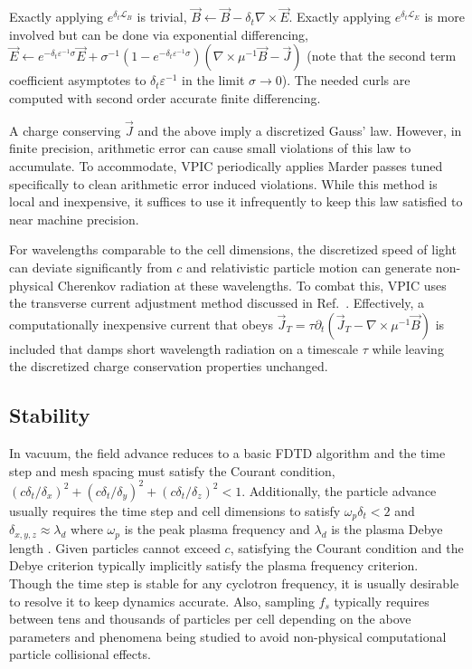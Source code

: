 \documentclass[letter,10pt]{article}
\newcommand{\eps}{\varepsilon}
\newcommand{\vecJ}{\vec{J}}
\newcommand{\vecE}{\vec{E}}
\newcommand{\vecB}{\vec{B}}
\newcommand{\op}{\mathcal{L}}
\newcommand{\PDeriv}[2]{\partial_{#2}#1}
\newcommand{\Curl}[1]{\nabla \times #1}
\begin{document}
Exactly applying $e^{\delta_t \op_B}$ is trivial, $\vecB \leftarrow
\vecB - \delta_t \Curl{\vecE}$.  Exactly applying
$e^{\delta_t \op_E}$ is more involved but can be done via
exponential differencing, $\vecE \leftarrow e^{-\delta_t \eps^{-1}
\sigma} \vecE +
\sigma^{-1}\left( 1 - e^{-\delta_t \eps^{-1} \sigma} \right)
\left( \Curl{\mu^{-1}\vecB} - \vecJ \right)$ (note that the second
term coefficient asymptotes to $\delta_t \eps^{-1}$ in the limit
$\sigma \rightarrow 0$).  The needed curls are computed with second
order accurate finite differencing.

A charge conserving $\vecJ$ and the above imply a discretized Gauss'
law.  However, in finite precision, arithmetic error can cause small
violations of this law to accumulate.  To accommodate, VPIC
periodically applies Marder passes \cite{Marder_1987} tuned
specifically to clean arithmetic error induced violations.  While this
method is local and inexpensive, it suffices to use it infrequently to
keep this law satisfied to near machine precision.

For wavelengths comparable to the cell dimensions, the discretized
speed of light can deviate significantly from $c$ and relativistic
particle motion can generate non-physical Cherenkov radiation at these
wavelengths.  To combat this, VPIC uses the transverse current
adjustment method discussed in Ref.~\cite{Eastwood_et_al_1995}.
Effectively, a computationally inexpensive current that obeys $\vecJ_T
= \tau \PDeriv{\left(\vecJ_T - \Curl{\mu^{-1}\vecB}\right)}{t}$ is
included that damps short wavelength radiation on a timescale $\tau$
while leaving the discretized charge conservation properties unchanged.

\subsection{Stability}

In vacuum, the field advance reduces to a basic FDTD algorithm
\cite{Yee_1966} and the time step and mesh spacing must satisfy the
Courant condition,
$\left(c\delta_t/\delta_x\right)^2 +
 \left(c\delta_t/\delta_y\right)^2 +
 \left(c\delta_t/\delta_z\right)^2 < 1$.
Additionally, the particle advance usually requires the time step and
cell dimensions to satisfy $\omega_p \delta_t < 2$ and $\delta_{x,y,z}
\approx \lambda_d$ where $\omega_p$ is the peak plasma frequency and
$\lambda_d$ is the plasma Debye length
\cite{Birdsall_Langdon_1985,Hockney_Eastwood_1988}.
Given particles cannot exceed $c$, satisfying the Courant condition
and the Debye criterion typically implicitly satisfy the plasma
frequency criterion.  Though the time step is stable for any cyclotron
frequency, it is usually desirable to resolve it to keep dynamics
accurate.  Also, sampling $f_s$ typically requires between tens and
thousands of particles per cell depending on the above parameters and
phenomena being studied to avoid non-physical computational particle
collisional effects.
\end{document}
